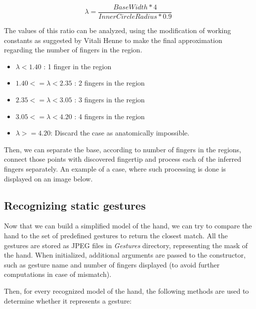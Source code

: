 \documentclass[a4paper,11pt,oneside]{article}
\begin{document}
\[\lambda = \frac{BaseWidth * 4}{InnerCircleRadius * 0.9} \]

The values of this ratio can be analyzed, using the modification of working constants as suggested by Vitali Henne \cite{VH01} to make the final approximation regarding the number of fingers in the region.

\begin{itemize}
\item $\lambda < 1.40$ : 1 finger in the region
\item $1.40 <= \lambda < 2.35$ : 2 fingers in the region
\item $2.35 <= \lambda < 3.05$ : 3 fingers in the region
\item $3.05 <= \lambda < 4.20$ : 4 fingers in the region
\item $\lambda >= 4.20$: Discard the case as anatomically impossible.
\end{itemize}

Then, we can separate the base, according to number of fingers in the regions, connect those points with discovered fingertip and process each of the inferred fingers separately. An example of a case, where such processing is done is displayed on an image below.


\subsection{Recognizing static gestures}

Now that we can build a simplified model of the hand, we can try to compare the hand to the set of predefined gestures to return the closest match. All the gestures are stored as JPEG files in \textit{Gestures} directory, representing the mask of the hand. When initialized,  additional arguments are passed to the constructor, such as gesture name and number of fingers displayed (to avoid further computations in case of mismatch).

Then, for every recognized model of the hand, the following methods are used to determine whether it represents a gesture:\\
\end{document}
